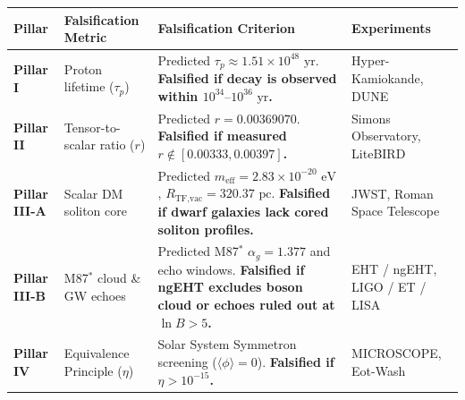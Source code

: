 \documentclass[11pt, a4paper]{article}
\begin{document}
\begin{center}
{\small
\setlength{\tabcolsep}{4.5pt}
\begin{tabular}{p{2.0cm} p{3.6cm} p{6.2cm} p{3.2cm}}
\toprule
\textbf{Pillar} & \textbf{Falsification Metric} & \textbf{Falsification Criterion} & \textbf{Experiments} \\
\midrule
\textbf{Pillar I} & Proton lifetime ($\tau_p$) & Predicted $\tau_p \approx 1.51 \times 10^{48}\text{ yr}$. \textbf{Falsified if decay is observed within $10^{34}\text{--}10^{36}\text{ yr}$.} & Hyper-Kamiokande, DUNE \\
\rowcolor{rowtint}
\textbf{Pillar II} & Tensor-to-scalar ratio ($r$) & Predicted $r = 0.00369070$. \textbf{Falsified if measured $r \notin [0.00333, 0.00397]$.} & Simons Observatory, LiteBIRD \\
\textbf{Pillar III-A} & Scalar DM soliton core & Predicted $m_{\text{eff}} = 2.83 \times 10^{-20}\text{ eV}$, $R_{\text{TF,vac}} = 320.37\text{ pc}$. \textbf{Falsified if dwarf galaxies lack cored soliton profiles.} & JWST, Roman Space Telescope \\
\rowcolor{rowtint}
\textbf{Pillar III-B} & M87$^*$ cloud \& GW echoes & Predicted M87$^*$ $\alpha_g = 1.377$ and echo windows. \textbf{Falsified if ngEHT excludes boson cloud or echoes ruled out at $\ln B > 5$.} & EHT / ngEHT, LIGO / ET / LISA \\
\textbf{Pillar IV} & Equivalence Principle ($\eta$) & Solar System Symmetron screening ($\langle\phi\rangle = 0$). \textbf{Falsified if $\eta > 10^{-15}$.} & MICROSCOPE, Eot-Wash \\
\bottomrule
\end{tabular}
}
\end{center}
\end{document}
